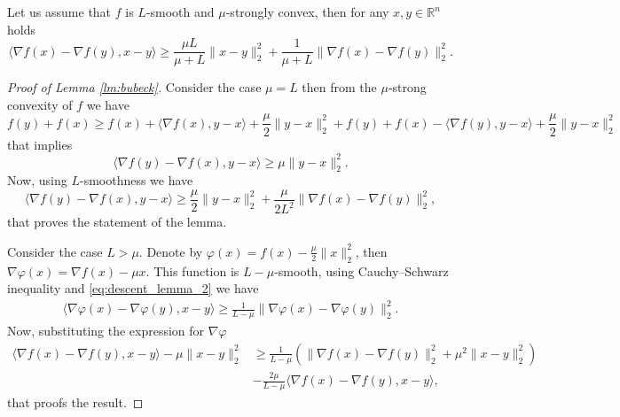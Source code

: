 \begin{lemma}\label{lm:bubeck}
Let us assume that $f$ is $L$-smooth and $\mu$-strongly convex, then for any $x,y\in\mathbb{R}^n$ holds
\begin{equation}\label{eq:bubeck}
\langle \nabla f(x)- \nabla f(y), x - y\rangle\geq \frac{\mu L}{\mu + L}\|x-y\|_2^2 + \frac{1}{\mu + L}\|\nabla f(x) - \nabla f(y)\|_2^2.
\end{equation}
\end{lemma}
\begin{proof}[Proof of Lemma \ref{lm:bubeck}]
Consider the case $\mu = L$ then from the $\mu$-strong convexity of $f$ we have
$$
f(y) + f(x) \geq f(x) + \langle \nabla f(x), y-x\rangle + \frac{\mu}{2}\|y-x\|_2^2 + f(y) + f(x) - \langle \nabla f(y), y-x\rangle + \frac{\mu}{2}\|y-x\|_2^2
$$
that implies 
\begin{equation}
    \langle \nabla f(y) - \nabla f(x), y-x\rangle\geq \mu\|y-x\|_2^2.
\end{equation}
Now, using $L$-smoothness we have
\begin{equation}
    \langle \nabla f(y) - \nabla f(x), y-x\rangle\geq \frac{\mu}{2}\|y-x\|_2^2 + \frac{\mu}{2L^2}\|\nabla f(x) - \nabla f(y)\|_2^2,
\end{equation}
that proves the statement of the lemma.

Consider the case $L>\mu$. Denote by $\varphi(x)=f(x) -\frac{\mu}{2}\|x\|_2^2$, then $\nabla \varphi(x) = \nabla f(x) - \mu x$. This function is $L-\mu$-smooth, using Cauchy–Schwarz inequality and \eqref{eq:descent_lemma_2} we have
\begin{align}
\langle \nabla\varphi(x) -\nabla\varphi(y), x-y\rangle\geq \frac{1}{L-\mu}\|\nabla \varphi(x) - \nabla \varphi(y)\|_2^2.
\end{align}
Now, substituting the expression for $\nabla \varphi$ 
\begin{align}
\langle \nabla f(x)- \nabla f(y), x - y\rangle - \mu\|x-y\|_2^2 &\geq \frac{1}{L-\mu}\left(\|\nabla f(x) - \nabla f(y)\|_2^2 + \mu^2\|x-y\|_2^2\right)\nonumber\\
&- \frac{2\mu}{L-\mu} \langle \nabla f(x)- \nabla f(y), x - y\rangle,
\end{align}
that proofs the result.
\end{proof}


